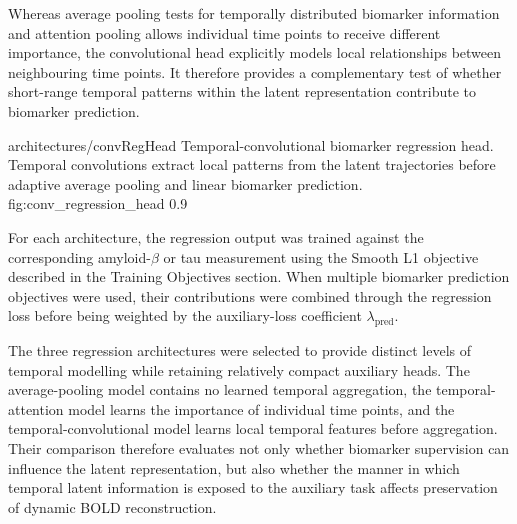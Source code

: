 Whereas average pooling tests for temporally distributed biomarker
information and attention pooling allows individual time points to receive
different importance, the convolutional head explicitly models local
relationships between neighbouring time points. It therefore provides a
complementary test of whether short-range temporal patterns within the
latent representation contribute to biomarker prediction.

\thesisfigure
    {architectures/convRegHead}
    {Temporal-convolutional biomarker regression head. Temporal
    convolutions extract local patterns from the latent trajectories before
    adaptive average pooling and linear biomarker prediction.}
    {fig:conv_regression_head}
    {0.9\textwidth}

For each architecture, the regression output was trained against the
corresponding amyloid-$\beta$ or tau measurement using the Smooth L1
objective described in the Training Objectives section. When multiple
biomarker prediction objectives were used, their contributions were
combined through the regression loss before being weighted by the
auxiliary-loss coefficient $\lambda_{\mathrm{pred}}$.

The three regression architectures were selected to provide distinct levels
of temporal modelling while retaining relatively compact auxiliary heads.
The average-pooling model contains no learned temporal aggregation, the
temporal-attention model learns the importance of individual time points,
and the temporal-convolutional model learns local temporal features before
aggregation. Their comparison therefore evaluates not only whether
biomarker supervision can influence the latent representation, but also
whether the manner in which temporal latent information is exposed to the
auxiliary task affects preservation of dynamic BOLD reconstruction.

